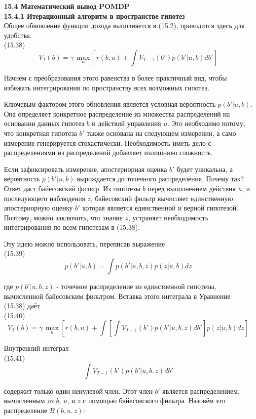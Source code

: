 \documentclass[10pt,a4paper]{article}
\begin{document}
\textbf{15.4	Математический вывод POMDP}\\

\textbf{15.4.1	Итерационный алгоритм в пространстве гипотез}\\

Общее обновление функции дохода выполняется в (15.2), приводится здесь для удобства.\\

(15.38)
$$V_T(b)=\gamma\,\underset{u}{\max}\left[ r(b,u)+\int V_{T-1}(b')p(b'|u,b)db'\right] $$

Начнём с преобразования этого равенства в более практичный вид, чтобы избежать интегрирования по пространству всех возможных гипотез.

Ключевым фактором этого обновления является условная вероятность $p(b' | u, b)$. Она определяет конкретное распределение из множества распределений на основании данных гипотез $b$ и действий управления $u$. Это необходимо потому, что конкретная гипотеза $b'$ также основана на следующем измерении, а само измерение генерируется стохастически. Необходимость иметь дело с распределениями из распределений добавляет излишнюю сложность.

Если зафиксировать измерение, апостериорная оценка $b'$ будет уникальна, а вероятность $p(b' | u, b)$ вырождается до точечного распределения. Почему так? Ответ даст байесовский фильтр. Из гипотезы $b$ перед выполнением действия $u$, и последующего наблюдения $z$, байесовский фильтр вычисляет единственную апостериорную оценку $b'$ которая является единственной и верной гипотезой. Поэтому, можно заключить, что знание $z$, устраняет необходимость интегрирования по всем гипотезам в (15.38).

Эту идею можно использовать, переписав выражение\\

(15.39)
$$p(b'|u,b)=\int p(b'|u,b,z)p(z|u,b)dz$$

где $p(b' | u, b, z)$ - точечное распределение из единственной гипотезы, вычисленной байесовским фильтром. Вставка этого интеграла в Уравнение (15.38) даёт\\

(15.40)
$$V_T(b)=\gamma\,\underset{u}{\max}\left[ r(b,u)+\int\left[ \int V_{T-1}(b')p(b'|u,b,z)db'\right] p(z|u,b)dz\right] $$

Внутренний интеграл\\

(15.41)
$$\int V_{T-1}(b')p(b'|u,b,z)db'$$

содержит только один ненулевой член. Этот член $b'$ является распределением, вычисленным из $b$, $u$, и $z$ с помощью байесовского фильтра. Назовём это распределение $B(b, u, z)$:\\
\end{document}
